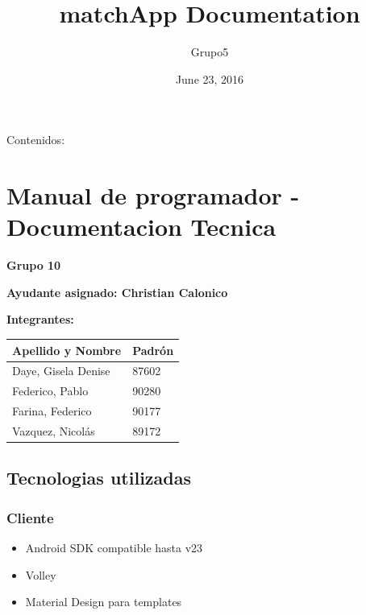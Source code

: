 \documentclass[letterpaper,10pt,english]{sphinxmanual}
\title{matchApp Documentation}
\date{June 23, 2016}
\author{Grupo5}
\begin{document}
\maketitle
\tableofcontents
{}\label{index::doc}


Contenidos:


\chapter{Manual de programador - Documentacion Tecnica}
\label{manuals::doc}\label{manuals:manual-de-programador-documentacion-tecnica}\label{manuals:documentacion-de-matchapp}
\textbf{Grupo 10}

\textbf{Ayudante asignado: Christian Calonico}

\textbf{Integrantes:}

\begin{tabulary}{\linewidth}{|L|L|}
\hline
\textsf{\relax 
Apellido y Nombre
} & \textsf{\relax 
Padrón
}\\
\hline
Daye, Gisela Denise
 & 
87602
\\
\hline
Federico, Pablo
 & 
90280
\\
\hline
Farina, Federico
 & 
90177
\\
\hline
Vazquez, Nicolás
 & 
89172
\\
\hline\end{tabulary}



\section{Tecnologias utilizadas}
\label{manuals:tecnologias-utilizadas}

\subsection{Cliente}
\label{manuals:cliente}\begin{itemize}
\item {} 
Android SDK compatible hasta v23

\item {} 
Volley

\item {} 
Material Design para templates

\end{itemize}
\end{document}
